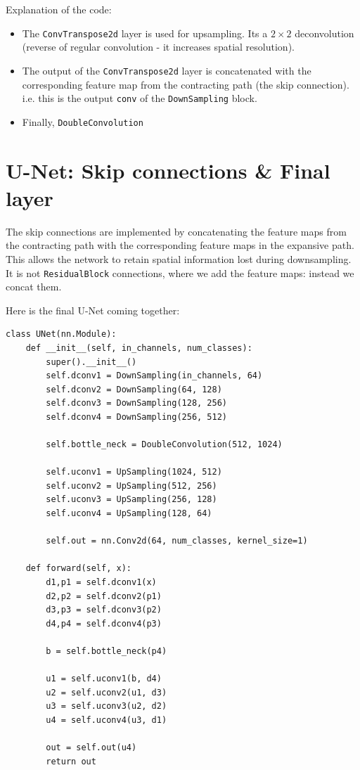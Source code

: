 \documentclass{article}
\begin{document}
Explanation of the code:

\begin{itemize}
    \item The \texttt{ConvTranspose2d} layer is used for upsampling. Its a $2\times 2$ deconvolution (reverse of regular convolution - it increases spatial resolution).
    \item The output of the \texttt{ConvTranspose2d} layer is concatenated with the corresponding feature map from the contracting path (the skip connection). i.e. this is the output \texttt{conv} of the \texttt{DownSampling} block.
    \item Finally, \texttt{DoubleConvolution}
\end{itemize}








\section{U-Net: Skip connections \& Final layer}

The skip connections are implemented by concatenating the feature maps from the contracting path with the corresponding feature maps in the expansive path. This allows the network to retain spatial information lost during downsampling. It is not \texttt{ResidualBlock} connections, where we add the feature maps: instead we concat them.

Here is the final U-Net coming together:

\begin{verbatim}
class UNet(nn.Module):
    def __init__(self, in_channels, num_classes):
        super().__init__()
        self.dconv1 = DownSampling(in_channels, 64)
        self.dconv2 = DownSampling(64, 128)
        self.dconv3 = DownSampling(128, 256)
        self.dconv4 = DownSampling(256, 512)

        self.bottle_neck = DoubleConvolution(512, 1024)

        self.uconv1 = UpSampling(1024, 512)
        self.uconv2 = UpSampling(512, 256)
        self.uconv3 = UpSampling(256, 128)
        self.uconv4 = UpSampling(128, 64)

        self.out = nn.Conv2d(64, num_classes, kernel_size=1)

    def forward(self, x):
        d1,p1 = self.dconv1(x)
        d2,p2 = self.dconv2(p1)
        d3,p3 = self.dconv3(p2)
        d4,p4 = self.dconv4(p3)

        b = self.bottle_neck(p4)
        
        u1 = self.uconv1(b, d4)
        u2 = self.uconv2(u1, d3)
        u3 = self.uconv3(u2, d2)
        u4 = self.uconv4(u3, d1)

        out = self.out(u4)
        return out
\end{verbatim}
\end{document}
